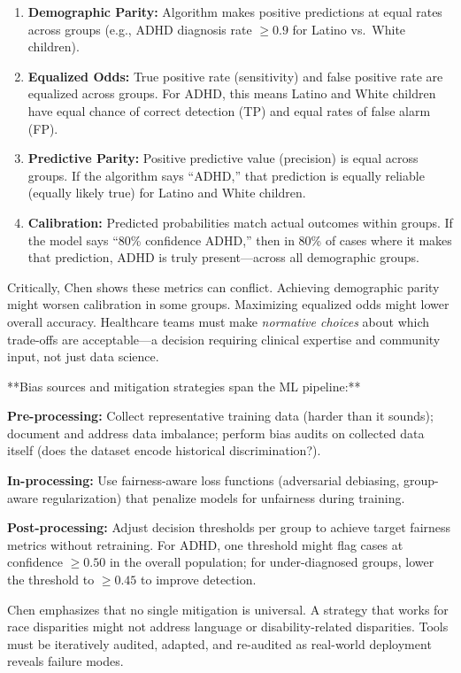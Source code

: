 \documentclass[12pt,twoside]{article}
\begin{document}
\begin{enumerate}
\item \textbf{Demographic Parity:} Algorithm makes positive predictions at equal rates across groups (e.g., ADHD diagnosis rate $\ge 0.9$ for Latino vs.\ White children).
\item \textbf{Equalized Odds:} True positive rate (sensitivity) and false positive rate are equalized across groups. For ADHD, this means Latino and White children have equal chance of correct detection (TP) and equal rates of false alarm (FP).
\item \textbf{Predictive Parity:} Positive predictive value (precision) is equal across groups. If the algorithm says ``ADHD,'' that prediction is equally reliable (equally likely true) for Latino and White children.
\item \textbf{Calibration:} Predicted probabilities match actual outcomes within groups. If the model says ``80\% confidence ADHD,'' then in 80\% of cases where it makes that prediction, ADHD is truly present---across all demographic groups.
\end{enumerate}

Critically, Chen shows these metrics can conflict. Achieving demographic parity might worsen calibration in some groups. Maximizing equalized odds might lower overall accuracy. Healthcare teams must make \emph{normative choices} about which trade-offs are acceptable---a decision requiring clinical expertise and community input, not just data science.

**Bias sources and mitigation strategies span the ML pipeline:**

\textbf{Pre-processing:} Collect representative training data (harder than it sounds); document and address data imbalance; perform bias audits on collected data itself (does the dataset encode historical discrimination?).

\textbf{In-processing:} Use fairness-aware loss functions (adversarial debiasing, group-aware regularization) that penalize models for unfairness during training.

\textbf{Post-processing:} Adjust decision thresholds per group to achieve target fairness metrics without retraining. For ADHD, one threshold might flag cases at confidence $\ge 0.50$ in the overall population; for under-diagnosed groups, lower the threshold to $\ge 0.45$ to improve detection.

Chen emphasizes that no single mitigation is universal. A strategy that works for race disparities might not address language or disability-related disparities. Tools must be iteratively audited, adapted, and re-audited as real-world deployment reveals failure modes.
\end{document}
